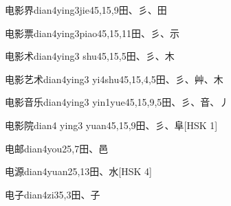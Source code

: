\begin{EntryWithPhonetic}{电影界}{dian4ying3jie4}{5,15,9}{⽥、⼺、⽥}
\end{EntryWithPhonetic}

\begin{EntryWithPhonetic}{电影票}{dian4ying3piao4}{5,15,11}{⽥、⼺、⽰}
\end{EntryWithPhonetic}

\begin{EntryWithPhonetic}{电影术}{dian4ying3 shu4}{5,15,5}{⽥、⼺、⽊}
\end{EntryWithPhonetic}

\begin{EntryWithPhonetic}{电影艺术}{dian4ying3 yi4shu4}{5,15,4,5}{⽥、⼺、⾋、⽊}
\end{EntryWithPhonetic}

\begin{EntryWithPhonetic}{电影音乐}{dian4ying3 yin1yue4}{5,15,9,5}{⽥、⼺、⾳、⼃}
\end{EntryWithPhonetic}

\begin{EntryWithPhonetic}{电影院}{dian4 ying3 yuan4}{5,15,9}{⽥、⼺、⾩}[HSK 1]
\end{EntryWithPhonetic}

\begin{EntryWithPhonetic}{电邮}{dian4you2}{5,7}{⽥、⾢}
\end{EntryWithPhonetic}

\begin{EntryWithPhonetic}{电源}{dian4yuan2}{5,13}{⽥、⽔}[HSK 4]
\end{EntryWithPhonetic}

\begin{EntryWithPhonetic}{电子}{dian4zi3}{5,3}{⽥、⼦}
\end{EntryWithPhonetic}

